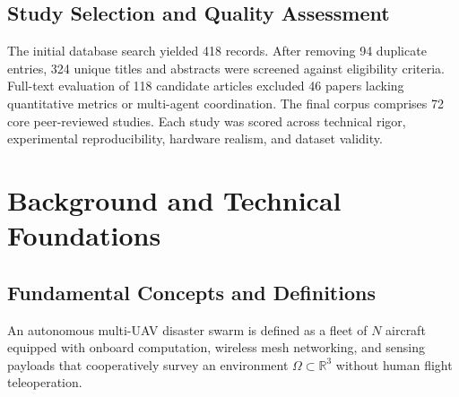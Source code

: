 \documentclass[journal]{IEEEtran}
\begin{document}
\begin{table}[!t]
\caption{Systematic Literature Search Strategy and Eligibility Criteria}
\label{tab_search_strategy}
\centering
\small
{}
\end{table}

\subsection{Study Selection and Quality Assessment}
The initial database search yielded 418 records. After removing 94 duplicate entries, 324 unique titles and abstracts were screened against eligibility criteria. Full-text evaluation of 118 candidate articles excluded 46 papers lacking quantitative metrics or multi-agent coordination. The final corpus comprises 72 core peer-reviewed studies. Each study was scored across technical rigor, experimental reproducibility, hardware realism, and dataset validity.

\section{Background and Technical Foundations}

\subsection{Fundamental Concepts and Definitions}
An autonomous multi-UAV disaster swarm is defined as a fleet of $N$ aircraft equipped with onboard computation, wireless mesh networking, and sensing payloads that cooperatively survey an environment $\Omega \subset \mathbb{R}^3$ without human flight teleoperation.
\end{document}
